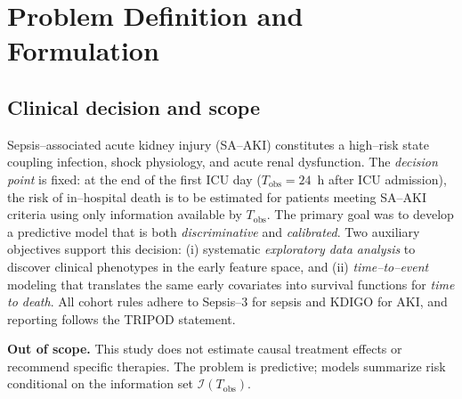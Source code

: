 \chapter{Problem Definition and Formulation}
\label{chap:problem}

\section{Clinical decision and scope}
Sepsis–associated acute kidney injury (SA--AKI) constitutes a high–risk state coupling infection, shock physiology, and acute renal dysfunction. The \emph{decision point} is fixed: at the end of the first ICU day ($T_{\mathrm{obs}}{=}24$~h after ICU admission), the risk of in–hospital death is to be estimated for patients meeting SA--AKI criteria using only information available by $T_{\mathrm{obs}}$. The primary goal was to develop a predictive model that is both \emph{discriminative} and \emph{calibrated}. Two auxiliary objectives support this decision: (i) systematic \emph{exploratory data analysis} to discover clinical phenotypes in the early feature space, and (ii) \emph{time–to–event} modeling that translates the same early covariates into survival functions for \emph{time to death}. All cohort rules adhere to Sepsis--3 for sepsis and KDIGO for AKI, and reporting follows the TRIPOD statement.

\noindent\textbf{Out of scope.} This study does not estimate causal treatment effects or recommend specific therapies. The problem is predictive; models summarize risk conditional on the information set $\mathcal{I}(T_{\mathrm{obs}})$.

